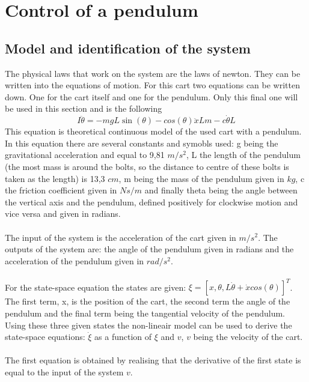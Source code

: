 \section{Control of a pendulum}
\subsection{Model and identification of the system}

The physical laws that work on the system are the laws of newton. They can be written into the equations of motion. For this cart two equations can be written down. One for the cart itself and one for the pendulum. Only this final one will be used in this section and is the following
\begin{equation}
    \label{eq:eqofmotion}
    I\ddot{\theta} = -mgL\sin(\theta) - cos(\theta)\ddot{x}Lm - c\dot{\theta}L
\end{equation}
This equation is theoretical continuous model of the used cart with a pendulum. In this equation there are several constants and symobls used: g being the gravitational acceleration and equal to 9,81 $m/s^{2}$, L the length of the pendulum (the most mass is around the bolts, so the distance to centre of these bolts is taken as the length) is 13,3 $cm$, m being the mass of the pendulum given in $kg$, c the friction coefficient given in $Ns/m$ and finally theta being the angle between the vertical axis and the pendulum, defined positively for clockwise motion and vice versa and given in radians.\\
\\
The input of the system is the acceleration of the cart given in $m/s^{2}$. The outputs of the system are: the angle of the pendulum given in radians and the acceleration of the pendulum given in $rad/s^{2}$.\\
\\
For the state-space equation the states are given: $\xi = [x, \theta, L\dot{\theta}+\dot{x}cos(\theta)]^{T}$. The first term, x, is the position of the cart, the second term the angle of the pendulum and the final term being the tangential velocity of the pendulum. Using these three given states the non-lineair model can be used to derive the state-space equations: $\dot{\xi}$ as a function of $\xi$ and $v$, $v$ being the velocity of the cart.\\
\\
The first equation is obtained by realising that the derivative of the first state is equal to the input of the system $v$.\\
